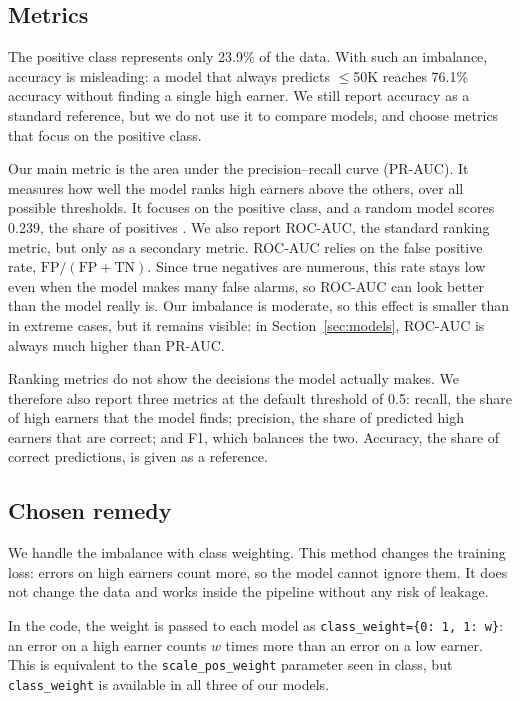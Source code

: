 \documentclass[10pt,a4paper]{article}
\newcommand{\low}{$\leq$50K}
\begin{document}
\subsection{Metrics}
The positive class represents only 23.9\% of the data. With such an imbalance, accuracy
is misleading: a model that always predicts \low{} reaches 76.1\% accuracy without finding
a single high earner. We still report accuracy as a standard reference, but we do not use it to compare
models, and choose metrics that focus on the positive class.

Our main metric is the area under the precision--recall curve (PR-AUC). It measures how
well the model ranks high earners above the others, over all possible thresholds. It
focuses on the positive class, and a random model scores 0.239, the share of positives
\cite{saito2015}. We also report ROC-AUC, the standard ranking metric, but only as a
secondary metric. ROC-AUC relies on the false positive rate, $\mathrm{FP}/(\mathrm{FP} +
\mathrm{TN})$. Since true negatives are numerous, this rate stays low even when the model
makes many false alarms, so ROC-AUC can look better than the model really is. Our
imbalance is moderate, so this effect is smaller than in extreme cases, but it remains
visible: in Section~\ref{sec:models}, ROC-AUC is always much higher than PR-AUC.

Ranking metrics do not show the decisions the model actually makes. We therefore also
report three metrics at the default threshold of 0.5: recall, the share of high earners
that the model finds; precision, the share of predicted high earners that are correct;
and F1, which balances the two. Accuracy, the share of correct predictions, is given as a
reference.

\subsection{Chosen remedy}
We handle the imbalance with class weighting. This method changes the training loss:
errors on high earners count more, so the model cannot ignore them. It does not change
the data and works inside the pipeline without any risk of leakage.

In the code, the weight is passed to each model as \verb|class_weight={0: 1, 1: w}|:
an error on a high earner counts $w$ times more than an error on a low earner. This is
equivalent to the \texttt{scale\_pos\_weight} parameter seen in class, but \texttt{class\_weight} 
is available in all three of our models.
\end{document}
